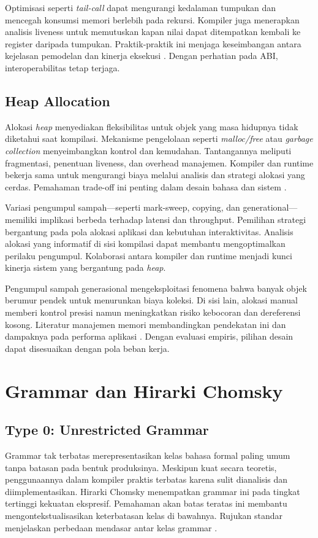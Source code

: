 \documentclass[../main.tex]{subfiles}
\begin{document}
Optimisasi seperti \emph{tail-call} dapat mengurangi kedalaman tumpukan dan mencegah konsumsi memori berlebih pada rekursi. Kompiler juga menerapkan analisis liveness untuk memutuskan kapan nilai dapat ditempatkan kembali ke register daripada tumpukan. Praktik-praktik ini menjaga keseimbangan antara kejelasan pemodelan dan kinerja eksekusi \citep{WikiCallStack}. Dengan perhatian pada ABI, interoperabilitas tetap terjaga.

\subsection{Heap Allocation}
Alokasi \emph{heap} menyediakan fleksibilitas untuk objek yang masa hidupnya tidak diketahui saat kompilasi. Mekanisme pengelolaan seperti \emph{malloc/free} atau \emph{garbage collection} menyeimbangkan kontrol dan kemudahan. Tantangannya meliputi fragmentasi, penentuan liveness, dan overhead manajemen. Kompiler dan runtime bekerja sama untuk mengurangi biaya melalui analisis dan strategi alokasi yang cerdas. Pemahaman trade-off ini penting dalam desain bahasa dan sistem \citep{WikiMemory}.

Variasi pengumpul sampah—seperti mark-sweep, copying, dan generational—memiliki implikasi berbeda terhadap latensi dan throughput. Pemilihan strategi bergantung pada pola alokasi aplikasi dan kebutuhan interaktivitas. Analisis alokasi yang informatif di sisi kompilasi dapat membantu mengoptimalkan perilaku pengumpul. Kolaborasi antara kompiler dan runtime menjadi kunci kinerja sistem yang bergantung pada \emph{heap}.

Pengumpul sampah generasional mengeksploitasi fenomena bahwa banyak objek berumur pendek untuk menurunkan biaya koleksi. Di sisi lain, alokasi manual memberi kontrol presisi namun meningkatkan risiko kebocoran dan dereferensi kosong. Literatur manajemen memori membandingkan pendekatan ini dan dampaknya pada performa aplikasi \citep{WikiMemory}. Dengan evaluasi empiris, pilihan desain dapat disesuaikan dengan pola beban kerja.

\section{Grammar dan Hirarki Chomsky}
\subsection{Type 0: Unrestricted Grammar}
Grammar tak terbatas merepresentasikan kelas bahasa formal paling umum tanpa batasan pada bentuk produksinya. Meskipun kuat secara teoretis, penggunaannya dalam kompiler praktis terbatas karena sulit dianalisis dan diimplementasikan. Hirarki Chomsky menempatkan grammar ini pada tingkat tertinggi kekuatan ekspresif. Pemahaman akan batas teratas ini membantu mengontekstualisasikan keterbatasan kelas di bawahnya. Rujukan standar menjelaskan perbedaan mendasar antar kelas grammar \citep{WikiChomsky}.
\end{document}

